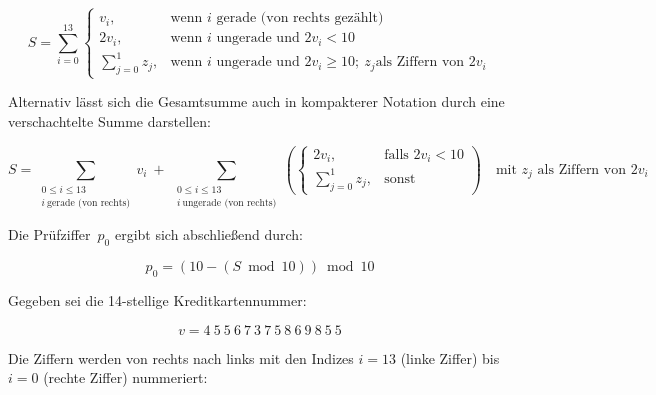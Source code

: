 \begin{equation}
\label{eq:Luhn-Summe-fallunterscheidung}
S = \sum_{i=0}^{13}
\begin{cases}
v_i, & \text{wenn $i$ gerade (von rechts gezählt)} \\
2v_i, & \text{wenn $i$ ungerade und } 2v_i < 10 \\
\displaystyle \sum_{j=0}^{1} z_j, & \text{wenn $i$ ungerade und } 2v_i \geq 10;\ z_j \text{als Ziffern von } 2v_i
\end{cases}
\end{equation}

Alternativ lässt sich die Gesamtsumme auch in kompakterer Notation durch eine verschachtelte Summe darstellen:

\begin{equation}
\label{eq:Luhn-Summe-quersumme}
S = \sum_{\substack{0 \leq i \leq 13 \\ i\ \text{gerade (von rechts)}}} v_i
\ + \ 
\sum_{\substack{0 \leq i \leq 13 \\ i\ \text{ungerade (von rechts)}}}
\left(
\begin{cases}
2v_i, & \text{falls } 2v_i < 10 \\
\displaystyle \sum_{j=0}^{1} z_j, & \text{sonst}
\end{cases}
\right)
\quad \text{mit } z_j \text{ als Ziffern von } 2v_i
\end{equation}

Die Prüfziffer~$p_0$ ergibt sich abschließend durch:

\begin{equation}
\label{eq:Luhn-Pruefziffer}
p_0 = (10 - (S \bmod 10)) \bmod 10
\end{equation}

Gegeben sei die 14-stellige Kreditkartennummer:

\begin{equation*}
v = 4\ 5\ 5\ 6\ 7\ 3\ 7\ 5\ 8\ 6\ 9\ 8\ 5\ 5
\end{equation*}

Die Ziffern werden von rechts nach links mit den Indizes $i = 13$ (linke Ziffer) bis $i = 0$ (rechte Ziffer) nummeriert:

